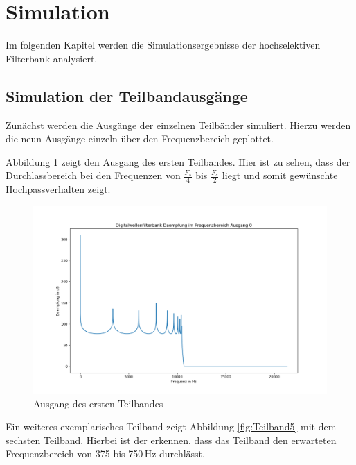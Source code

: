 %

\section{Simulation}
Im folgenden Kapitel werden die Simulationsergebnisse der hochselektiven Filterbank analysiert.

\subsection{Simulation der Teilbandausgänge}
Zunächst werden die Ausgänge der einzelnen Teilbänder simuliert. Hierzu werden die neun Ausgänge einzeln über den Frequenzbereich geplottet.\par
Abbildung \ref{fig:Teilband0} zeigt den Ausgang des ersten Teilbandes. Hier ist zu sehen, dass der Durchlassbereich bei den Frequenzen von $\frac{F_s}{4}$ bis $\frac{F_s}{2}$ liegt und somit gewünschte Hochpassverhalten zeigt.\par
\begin{figure}[h!]
	\centering	\includegraphics[width=14cm]{img/bank_freq_0.png}
	\caption{Ausgang des ersten Teilbandes}
	\label{fig:Teilband0}
\end{figure}
Ein weiteres exemplarisches Teilband zeigt Abbildung \ref{fig:Teilband5} mit dem sechsten Teilband. Hierbei ist der erkennen, dass das Teilband den erwarteten Frequenzbereich von 375 bis 750\,Hz durchlässt.\par
